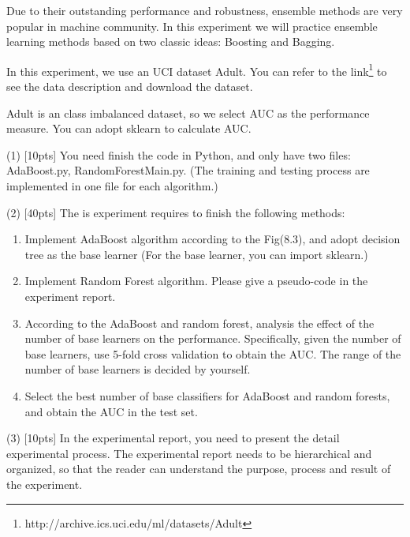 \begin{problem}
    Due to their outstanding performance and robustness, ensemble methods are very popular in machine community. In this experiment we will practice ensemble learning methods based on two classic
    ideas: Boosting and Bagging.

    In this experiment, we use an UCI dataset Adult. You can refer to the link\footnote{http://archive.ics.uci.edu/ml/datasets/Adult} to see the data description and download the dataset.

    Adult is an class imbalanced dataset, so we select AUC as the performance measure. You can adopt sklearn to calculate AUC.

    (1) [10pts] You need finish the code in Python, and only have two files: AdaBoost.py, RandomForestMain.py. (The training and testing process are implemented in one file for each algorithm.)

    (2) [40pts] The is experiment requires to finish the following methods:

    \begin{enumerate}
        \item Implement AdaBoost algorithm according to the Fig(8.3), and adopt decision tree as the base learner (For the base learner, you can import sklearn.)
        \item  Implement Random Forest algorithm. Please give a pseudo-code in the experiment report.
        \item According to the AdaBoost and random forest, analysis the effect of the number of base learners on the performance. Specifically, given the number of base learners, use 5-fold cross validation to obtain the AUC. The range of the number of base learners is decided by yourself.
        \item Select the best number of base classifiers for AdaBoost and random forests, and obtain the AUC in the test set.
    \end{enumerate}

    (3) [10pts] In the experimental report, you need to present the detail experimental process. The experimental report needs to be hierarchical and organized, so that the reader can understand the purpose, process and result of the experiment.

\end{problem}



